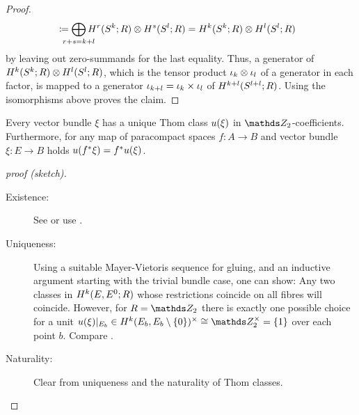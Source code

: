 \begin{Cor}
\begin{proof}
\begin{align*}
      &\coloneqq
        \bigoplus_{\mathclap{r+s=\rkk+\rkl}}
        \H^r(\Sphere{\rkk};R)\otimes \H^s(\Sphere{\rkl};R)
        =
        \H^{\rkk}(\Sphere{\rkk};R)\otimes \H^{\rkl}(\Sphere{\rkl};R)
    \end{align*}
    by leaving out zero-summands for the last equality.
    Thus, a generator of
    $H^{k}(S^{k}; R)\otimes H^{l}(S^{l}; R)$,
    which is the tensor product $\iota_{k}\otimes\iota_{l}$ of a generator
    in each factor,
    is mapped to a generator $\iota_{k+l}=\iota_{k}\times\iota_{l}$ of
    $H^{k+l}(S^{l+l}; R)$.
    Using the isomorphisms above proves the claim.
  \end{proof}
\end{Cor}

\begin{Cor}
  Every vector bundle $\xi$ has a unique Thom class ${u}(\xi)$ in
  $\Zmod2$-coefficients.
  Furthermore, for any map of paracompact spaces $f\colon A\to B$ and
  vector bundle $\xi\colon E\to B$ holds ${u}({f}^* \xi) = {f}^* {u}(\xi)$.
  \begin{proof}[proof (sketch)]
    \begin{description}
    \item[Existence:] See \cite[Theorem~4D.10]{hatcher} or use
      \cite[Prop.~17.9.3]{tomdieck}.
    \item[Uniqueness:]
      Using a suitable Mayer-Vietoris sequence for gluing, and an
      inductive argument starting with the trivial bundle case, one can show:
      Any two classes in $H^{k}(E, {E}^0;R)$ whose
      restrictions coincide on all fibres will coincide.
      However, for $R=\Zmod2$ there is exactly one possible choice for
      a unit $\u{\xi}|_{E_b}\in
      \H^{\rkk}(\spherepair{E_b})^\times\cong\Zmod2^\times=\{1\}$
      over each point $b$.
      Compare \forexample \cite[Theorem~(17.9.4)]{tomdieck}.
    \item[Naturality:]
      Clear from uniqueness and the naturality of Thom classes.
    \end{description}
  \end{proof}
\end{Cor}

